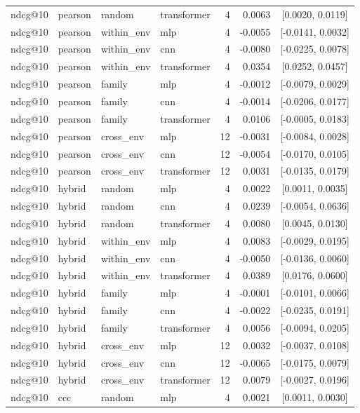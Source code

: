 \begin{longtable}{llllrrc}
ndcg@10 & pearson & random & transformer & 4 & 0.0063 & [0.0020, 0.0119] \\
ndcg@10 & pearson & within\_env & mlp & 4 & -0.0055 & [-0.0141, 0.0032] \\
ndcg@10 & pearson & within\_env & cnn & 4 & -0.0080 & [-0.0225, 0.0078] \\
ndcg@10 & pearson & within\_env & transformer & 4 & 0.0354 & [0.0252, 0.0457] \\
ndcg@10 & pearson & family & mlp & 4 & -0.0012 & [-0.0079, 0.0029] \\
ndcg@10 & pearson & family & cnn & 4 & -0.0014 & [-0.0206, 0.0177] \\
ndcg@10 & pearson & family & transformer & 4 & 0.0106 & [-0.0005, 0.0183] \\
ndcg@10 & pearson & cross\_env & mlp & 12 & -0.0031 & [-0.0084, 0.0028] \\
ndcg@10 & pearson & cross\_env & cnn & 12 & -0.0054 & [-0.0170, 0.0105] \\
ndcg@10 & pearson & cross\_env & transformer & 12 & 0.0031 & [-0.0135, 0.0179] \\
ndcg@10 & hybrid & random & mlp & 4 & 0.0022 & [0.0011, 0.0035] \\
ndcg@10 & hybrid & random & cnn & 4 & 0.0239 & [-0.0054, 0.0636] \\
ndcg@10 & hybrid & random & transformer & 4 & 0.0080 & [0.0045, 0.0130] \\
ndcg@10 & hybrid & within\_env & mlp & 4 & 0.0083 & [-0.0029, 0.0195] \\
ndcg@10 & hybrid & within\_env & cnn & 4 & -0.0050 & [-0.0136, 0.0060] \\
ndcg@10 & hybrid & within\_env & transformer & 4 & 0.0389 & [0.0176, 0.0600] \\
ndcg@10 & hybrid & family & mlp & 4 & -0.0001 & [-0.0101, 0.0066] \\
ndcg@10 & hybrid & family & cnn & 4 & -0.0022 & [-0.0235, 0.0191] \\
ndcg@10 & hybrid & family & transformer & 4 & 0.0056 & [-0.0094, 0.0205] \\
ndcg@10 & hybrid & cross\_env & mlp & 12 & 0.0032 & [-0.0037, 0.0108] \\
ndcg@10 & hybrid & cross\_env & cnn & 12 & -0.0065 & [-0.0175, 0.0079] \\
ndcg@10 & hybrid & cross\_env & transformer & 12 & 0.0079 & [-0.0027, 0.0196] \\
ndcg@10 & ccc & random & mlp & 4 & 0.0021 & [0.0011, 0.0030] \\

\end{longtable}
